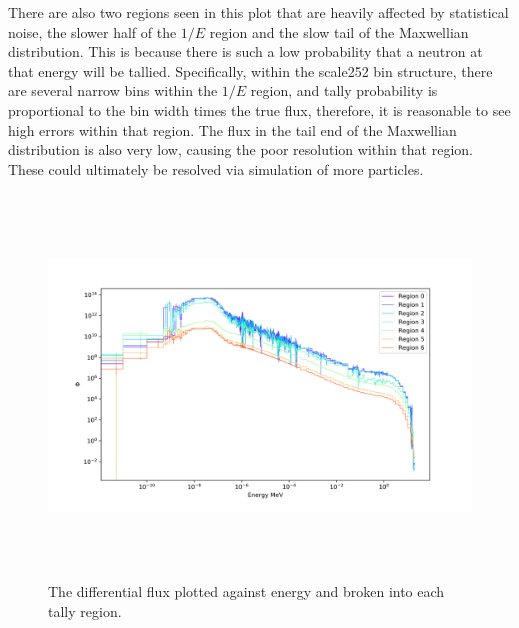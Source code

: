 There are also two regions seen in this plot that are heavily affected by statistical noise, the slower half of the $1/E$ region and the slow tail of the Maxwellian distribution.
This is because there is such a low probability that a neutron at that energy will be tallied.
Specifically, within the scale252 bin structure, there are several narrow bins within the $1/E$ region, and tally probability is proportional to the bin width times the true flux, therefore, it is reasonable to see high errors within that region.
The flux in the tail end of the Maxwellian distribution is also very low, causing the poor resolution within that region.
These could ultimately be resolved via simulation of more particles.



%
\begin{figure}[htb]
\centering
\includegraphics[height=4in]{tex/figures/flux_rad_erg.png}
\caption[Regional Flux vs. Energy]{The differential flux plotted against energy and broken into each tally region.}
\label{fig:flux_rad_erg}
\end{figure}

